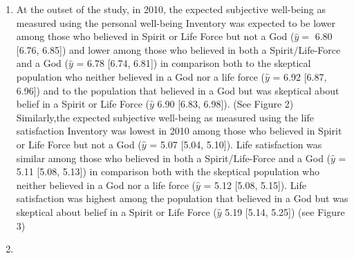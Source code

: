 \documentclass[
  english,
  man,floatsintext]{apa6}
\begin{document}
\begin{enumerate}
\def\labelenumi{\arabic{enumi}.}
\item
  At the outset of the study, in 2010, the expected subjective well-being as measured using the personal well-being Inventory was expected to be lower among those who believed in Spirit or Life Force but not a God (\(\hat{y} =\) 6.80 {[}6.76, 6.85{]}) and lower among those who believed in both a Spirit/Life-Force and a God (\(\hat{y}\) = 6.78 {[}6.74, 6.81{]}) in comparison both to the skeptical population who neither believed in a God nor a life force (\(\hat{y}\) = 6.92 {[}6.87, 6.96{]}) and to the population that believed in a God but was skeptical about belief in a Spirit or Life Force (\(\hat{y}\) 6.90 {[}6.83, 6.98{]}). (See Figure 2) Similarly,the expected subjective well-being as measured using the life satisfaction Inventory was lowest in 2010 among those who believed in Spirit or Life Force but not a God (\(\hat{y}\) = 5.07 {[}5.04, 5.10{]}). Life satisfaction was similar among those who believed in both a Spirit/Life-Force and a God (\(\hat{y}\) = 5.11 {[}5.08, 5.13{]}) in comparison both with the skeptical population who neither believed in a God nor a life force (\(\hat{y}\) = 5.12 {[}5.08, 5.15{]}). Life satisfaction was highest among the population that believed in a God but was skeptical about belief in a Spirit or Life Force (\(\hat{y}\) 5.19 {[}5.14, 5.25{]}) (see Figure 3)
\item

\end{enumerate}
\end{document}
